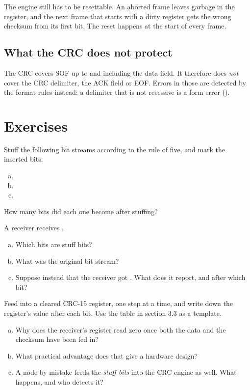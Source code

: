 \begin{aside}
 The engine still has to be resettable. An aborted frame leaves garbage in
the register, and the next frame that starts with a dirty register gets the wrong checksum from its
first bit. The reset happens at the start of every frame.
\end{aside}

\subsection{What the CRC does not protect}

The CRC covers SOF up to and including the data field. It therefore does \emph{not} cover the CRC
delimiter, the ACK field or EOF. Errors in those are detected by the format rules instead: a
delimiter that is not recessive is a form error ().

\section*{Exercises}

\label{ex:3:1}
Stuff the following bit streams according to the rule of five, and mark the inserted bits.
\begin{enumerate}[a)]
  \item {}
  \item {}
  \item {}
\end{enumerate}
How many bits did each one become after stuffing?

\label{ex:3:2}
A receiver receives .
\begin{enumerate}[a)]
  \item Which bits are stuff bits?
  \item What was the original bit stream?
  \item Suppose instead that the receiver got . What does it report, and after
    which bit?
\end{enumerate}

\label{ex:3:3}
Feed  into a cleared CRC-15 register, one step at a time, and write down the register's
value after each bit. Use the table in section 3.3 as a template.

\label{ex:3:4}
\begin{enumerate}[a)]
  \item Why does the receiver's register read zero once both the data and the checksum have been fed
    in?
  \item What practical advantage does that give a hardware design?
  \item A node by mistake feeds the \emph{stuff bits} into the CRC engine as well. What happens, and
    who detects it?
\end{enumerate}
